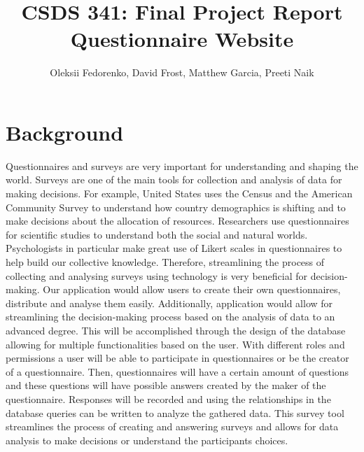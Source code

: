\documentclass[12pt, oneside]{article}
\title{CSDS 341: Final Project Report\\ Questionnaire Website}
\author{Oleksii Fedorenko, David Frost, Matthew Garcia, Preeti Naik}
\begin{document}
    \maketitle
    \section{Background}
    Questionnaires and surveys are very important for understanding and shaping the world. Surveys are one of the main tools for collection and analysis of data for making decisions. For example, United States uses the Census and the American Community Survey to understand how country demographics is shifting and to make decisions about the allocation of resources. Researchers use questionnaires for scientific studies to understand both the social and natural worlds. Psychologists in particular make great use of Likert scales in questionnaires to help build our collective knowledge. 
    \newline\newline\indent Therefore, streamlining the process of collecting and analysing surveys using technology is very beneficial for decision-making. Our application would allow users to create their own questionnaires, distribute and analyse them easily. Additionally, application would allow for streamlining the decision-making process based on the analysis of data to an advanced degree.
    \newline\newline\indent This will be accomplished through the design of the database allowing for multiple functionalities based on the user. With different roles and permissions a user will be able to participate in questionnaires or be the creator of a questionnaire. Then, questionnaires will have a certain amount of questions and these questions will have possible answers created by the maker of the questionnaire. Responses will be recorded and using the relationships in the database queries can be written to analyze the gathered data. This survey tool streamlines the process of creating and answering surveys and allows for data analysis to make decisions or understand the participants choices.
\end{document}
